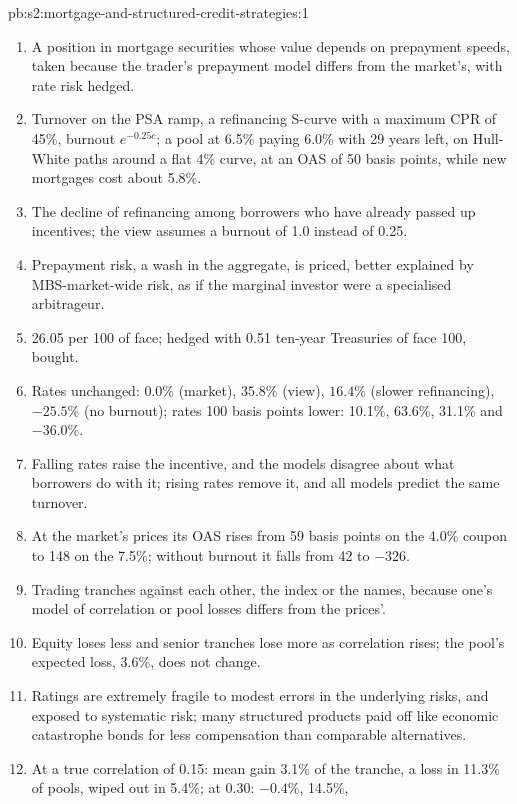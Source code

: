 \begin{solution}{pb:s2:mortgage-and-structured-credit-strategies:1}
\begin{enumerate}
\item A position in mortgage securities whose value depends on prepayment speeds, taken because the trader's prepayment model differs from the
market's, with rate risk hedged.
\item Turnover on the PSA ramp, a refinancing S-curve with a maximum CPR of 45\%, burnout $e^{-0.25c}$; a pool at 6.5\% paying 6.0\% with 29
years left, on Hull-White paths around a flat 4\% curve, at an OAS of 50 basis points, while new mortgages cost about 5.8\%.
\item The decline of refinancing among borrowers who have already passed up incentives; the view assumes a burnout of 1.0 instead of 0.25.
\item Prepayment risk, a wash in the aggregate, is priced, better explained by MBS-market-wide risk, as if the marginal investor were a specialised
arbitrageur.
\item 26.05 per 100 of face; hedged with 0.51 ten-year Treasuries of face 100, bought.
\item Rates unchanged: 0.0\% (market), $35.8\%$ (view), $16.4\%$ (slower refinancing), $-25.5\%$ (no burnout); rates 100 basis points lower:
10.1\%, 63.6\%, 31.1\% and $-36.0\%$.
\item Falling rates raise the incentive, and the models disagree about what borrowers do with it; rising rates remove it, and all models predict the
same turnover.
\item At the market's prices its OAS rises from 59 basis points on the 4.0\% coupon to 148 on the 7.5\%; without burnout it falls from 42 to
$-326$.
\item Trading tranches against each other, the index or the names, because one's model of correlation or pool losses differs from the prices'.
\item Equity loses less and senior tranches lose more as correlation rises; the pool's expected loss, 3.6\%, does not change.
\item Ratings are extremely fragile to modest errors in the underlying risks, and exposed to systematic risk; many structured products paid off like
economic catastrophe bonds for less compensation than comparable alternatives.
\item At a true correlation of 0.15: mean gain 3.1\% of the tranche, a loss in 11.3\% of pools, wiped out in 5.4\%; at 0.30: $-0.4\%$, 14.5\%,

\end{enumerate}
\end{solution}
